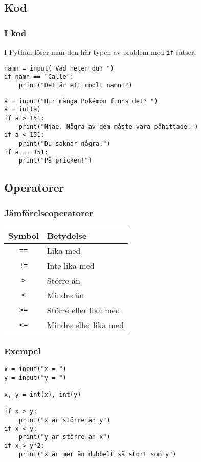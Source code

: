 \documentclass[aspectratio=169]{beamer}
\begin{document}
\subsection{Kod}

\begin{frame}[fragile]
	\frametitle{I kod}
	
	I Python löser man den här typen av problem med \lstinline{if}-satser.
	
	\begin{lstlisting}
namn = input("Vad heter du? ")
if namn == "Calle":
    print("Det är ett coolt namn!")
	\end{lstlisting}
	
	\pause
	
	\begin{lstlisting}
a = input("Hur många Pokémon finns det? ")
a = int(a)
if a > 151:
    print("Njae. Några av dem måste vara påhittade.")
if a < 151:
    print("Du saknar några.")
if a == 151:
    print("På pricken!")
	\end{lstlisting}

\end{frame}

\subsection{Operatorer}

\begin{frame}
\frametitle{Jämförelseoperatorer}

	\begin{center}
		\begin{tabular}{| c | l |}
			\hline
			Symbol 			& Betydelse\\ \hline
			\lstinline{==}		& Lika med\\
			\lstinline{!=}		& Inte lika med\\
			\lstinline{>}		& Större än\\
			\lstinline{<}		& Mindre än\\
			\lstinline{>=}		& Större eller lika med\\
			\lstinline{<=}		& Mindre eller lika med\\
			\hline
		\end{tabular}
	\end{center}

\end{frame}

\begin{frame}[fragile]
	\frametitle{Exempel}

	\begin{lstlisting}
x = input("x = ")
y = input("y = ")

x, y = int(x), int(y)

if x > y:
    print("x är större än y")
if x < y:
    print("y är större än x")
if x > y*2:
    print("x är mer än dubbelt så stort som y")
	\end{lstlisting}

\end{frame}
\end{document}
